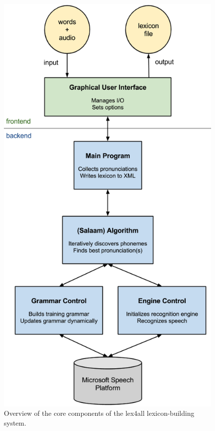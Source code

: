 \documentclass[11pt]{article}
\begin{document}
\begin{figure}[t]
\begin{center}
\includegraphics[width=\columnwidth]{../img/SystemOverview.png}
\caption{Overview of the core components of the lex4all lexicon-building system.\label{fig:system}}
\end{center}
\end{figure}
\end{document}
